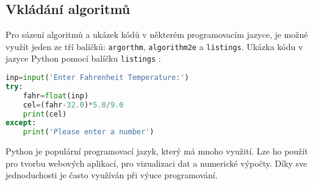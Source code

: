\documentclass[11pt, a4paper]{article}
\begin{document}
\newpage
\subsection{Vkládání algoritmů}
Pro sázení algoritmů a ukázek kódů v některém programovacím jazyce, je možné využít jeden ze tří balíčků: \verb|argorthm|, \verb|algorithm2e| a \verb|listings|.
Ukázka kódu v jazyce Python pomocí balíčku \verb|listings| \cite{book:python}:

 

\begin{lstlisting}[language=Python]
inp=input('Enter Fahrenheit Temperature:')
try:
    fahr=float(inp)
    cel=(fahr-32.0)*5.0/9.0
    print(cel)
except:
    print('Please enter a number')
\end{lstlisting}

Python je populární programovací jazyk, který má mnoho využití. Lze ho použít pro tvorbu webových aplikací, pro vizualizaci dat a numerické výpočty. Díky sve jednoduchosti je často využíván při výuce programování.\cite{thesis:python}


\renewcommand{\refname}{Literatura}

\end{document}
